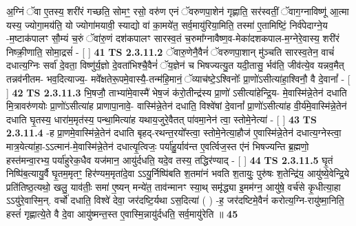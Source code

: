 \documentclass[17pt]{extarticle}
\begin{document}
                  अ॒ग्निं ॅवा ए॒तस्य॒ शरी॑रं गच्छति॒ सोमꣳ॒॒ रसो॒ वरु॑ण एनं ॅवरुणपा॒शेन॑ गृह्णाति॒ सर॑स्वतीं॒ ॅवाग॒ग्नाविष्णू॑ आ॒त्मा यस्य॒ ज्योगा॒मय॑ति॒ यो ज्योगा॑मयावी॒ स्याद्यो वा॑ का॒मये॑त॒ सर्व॒मायु॑रिया॒मिति॒ तस्मा॑ ए॒तामिष्टिं॒ निर्व॑पेदाग्ने॒य -म॒ष्टाक॑पालꣳ सौ॒म्यं च॒रुं ॅवा॑रु॒णं दश॑कपालꣳ सारस्व॒तं च॒रुमा᳚ग्नावैष्ण॒व-मेका॑दशकपाल-म॒ग्नेरे॒वास्य॒ शरी॑रं निष्क्री॒णाति॒ सोमा॒द्रसं॑ - [  ] \textbf{  41} \newline
                  \newline
                                \textbf{ TS 2.3.11.2} \newline
                  ॅवारु॒णेनै॒वैनं॑ ॅवरुणपा॒शान् मु॑ञ्चति सारस्व॒तेन॒ वाचं॑ दधात्य॒ग्निः सर्वा॑ दे॒वता॒ विष्णु॑र्य॒ज्ञो दे॒वता॑भिश्चै॒वैनं॑ ॅय॒ज्ञेन॑ च भिषज्यत्यु॒त यदी॒तासु॒ र्भव॑ति॒ जीव॑त्ये॒व यन्नव॒मैत् तन्नव॑नीतम- भव॒दित्याज्य॒- मवे᳚क्षतेरू॒पमे॒वास्यै॒-तन्म॑हि॒मानं॒ ॅव्याच॑ष्टे॒ऽश्विनोः᳚ प्रा॒णो॑ऽसीत्या॑हा॒श्विनौ॒ वै दे॒वानां᳚ - [  ] \textbf{  42} \newline
                  \newline
                                \textbf{ TS 2.3.11.3} \newline
                  भि॒षजौ॒ ताभ्या॑मे॒वास्मै॑ भेष॒जं क॑रो॒तीन्द्र॑स्य प्रा॒णो॑ ऽसीत्या॑हेन्द्रि॒य- मे॒वास्मि॑न्ने॒तेन॑ दधाति मि॒त्रावरु॑णयोः प्रा॒णो॑ऽसीत्या॑ह प्राणापा॒नावे॒- वास्मि॑न्ने॒तेन॑ दधाति॒ विश्वे॑षां दे॒वानां᳚ प्रा॒णो॑ऽसीत्या॑ह वी॒र्य॑मे॒वास्मि॑न्ने॒तेन॑ दधाति घृ॒तस्य॒ धारा॑म॒मृत॑स्य॒ पन्था॒मित्या॑ह यथाय॒जुरे॒वैतत् पा॑वमा॒नेन॑ त्वा॒ स्तोमे॒नेत्या॑ - [  ] \textbf{  43} \newline
                  \newline
                                \textbf{ TS 2.3.11.4} \newline
                  -ह प्रा॒णमे॒वास्मि॑न्ने॒तेन॑ दधाति बृहद्-रथन्त॒रयो᳚स्त्वा॒ स्तोमे॒नेत्या॒हौज॑ ए॒वास्मि॑न्ने॒तेन॑ दधात्य॒ग्नेस्त्वा॒ मात्र॒येत्या॑हा॒-ऽऽत्मान॑-मे॒वास्मि॑न्ने॒तेन॑ दधात्यृ॒त्विजः॒ पर्या॑हु॒र्याव॑न्त ए॒वर्त्विज॒स्त ए॑नं भिषज्यन्ति ब्र॒ह्मणो॒ हस्त॑मन्वा॒रभ्य॒ पर्या॑हुरेक॒धैव यज॑मान॒ आयु॑र्दधति॒ यदे॒व तस्य॒ तद्धिर॑ण्याद् - [  ] \textbf{  44} \newline
                  \newline
                                \textbf{ TS 2.3.11.5} \newline
                  घृ॒तं निष्पि॑ब॒त्यायु॒र्वै घृ॒तम॒मृतꣳ॒॒ हिर॑ण्यम॒मृता॑दे॒वा ऽऽयु॒र्निष्पि॑बति श॒तमा॑नं भवति श॒तायुः॒ पुरु॑षः श॒तेन्द्रि॑य॒ आयु॑ष्ये॒वेन्द्रि॒ये प्रति॑तिष्ठ॒त्यथो॒ खलु॒ याव॑तीः॒ समा॑ ए॒ष्यन् मन्ये॑त॒ ताव॑न्मानꣳ स्या॒थ् समृ॑द्ध्या इ॒मम॑ग्न॒ आयु॑षे॒ वर्च॑से कृ॒धीत्या॒हा ऽऽयु॑रे॒वास्मि॒न्. वर्चो॑ दधाति॒ विश्वे॑ देवा॒ जर॑दष्टि॒र्यथा ऽस॒दित्या॑ ( ) -ह॒ जर॑दष्टिमे॒वैनं॑ करोत्य॒ग्नि-रायु॑ष्मा॒निति॒ हस्तं॑ गृह्णात्ये॒ते वै दे॒वा आयु॑ष्मन्त॒स्त ए॒वास्मि॒न्नायु॑र्दधति॒ सर्व॒मायु॑रेति ॥ \textbf{  45} \newline
\end{document}
